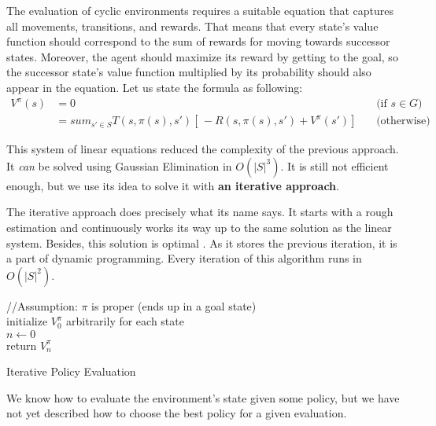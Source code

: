 The evaluation of cyclic environments requires a suitable equation that captures all movements, transitions, and rewards.
That means that every state's value function should correspond to the sum of rewards for moving towards successor states. Moreover, the agent should maximize its reward by getting to the goal, so the successor state's value function multiplied by its probability should also appear in the equation. Let us state the formula as following:\\
\begin{equation}
\begin{aligned}
V^{\pi} (s) & = 0 && \text{(if $s \in G$)} \\
& = sum_{s' \in S} T(s, \pi (s), s') [ \,-R(s, \pi(s), s') + V^{\pi} (s')] \, && \text{(otherwise)}
\end{aligned}
\end{equation}

This system of linear equations reduced the complexity of the previous approach. It \textit{can} be solved using Gaussian Elimination in $O(|S|^3)$. It is still not efficient enough, but we use its idea to solve it with \textbf{an iterative approach}.

The iterative approach does precisely what its name says. 
It starts with a rough estimation and continuously works its way up to the same solution as the linear system. Besides, this solution is optimal \cite{Kolobov2012}. As it stores the previous iteration, it is a part of dynamic programming. Every iteration of this algorithm runs in $O(|S|^2)$.

\LinesNumbered
\begin{algorithm}[H]
\SetAlgoLined
//Assumption: $\pi$ is proper (ends up in a goal state) \\
initialize $V^{\pi}_0$ arbitrarily for each state \\
$n \xleftarrow{} 0$ \\
return $V^{\pi}_n$
\caption{Iterative Policy Evaluation}
\end{algorithm}

We know how to evaluate the environment's state given some policy, but we have not yet described how to choose the best policy for a given evaluation. 

